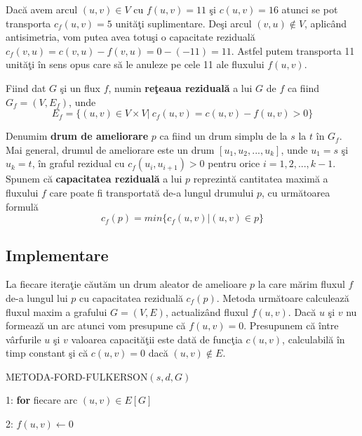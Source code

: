 \documentclass[11pt,a4paper]{report}
\begin{document}
   	  
   	  Dac\u a avem  arcul $(u,v)\in V$ cu $f(u,v)=11$ \c si $c(u,v)=16$ atunci se pot transporta $c_f(u,v)=5$ unit\u a\c ti suplimentare. De\c si arcul $(v,u)\notin V$, aplic\^ and antisimetria, vom putea avea totu\c si o capacitate rezidual\u a $c_f(v,u)=c(v,u)-f(v,u)=0-(-11)=11$. Astfel putem transporta 11 unit\u a\c ti \^ in sens opus care s\u a le anuleze pe cele 11 ale fluxului $f(u,v)$.
   	  
   	  
   	  Fiind dat $G$ \c si un flux $f$, numin \textbf{re\c teaua rezidual\u a} a lui $G$ de $f$ ca fiind $G_f=(V,E_f)$, unde 
     \begin{equation*}
	  E_f=\{(u,v)\in V\times V|\ c_f(u,v)=c(u,v)-f(u,v) >0 \}
	  \end{equation*} 	
   	


   	
  Denumim \textbf{drum de ameliorare} $p$ ca fiind un drum simplu de la $s$ la $t$ \^ in $G_f$. Mai general, drumul de ameliorare este un drum $[u_1,u_2,...,u_k]$, unde $u_1=s$ \c si $u_k=t$, \^ in graful rezidual cu $c_f(u_i,u_{i+1})>0$ pentru orice $i=1,2,...,k-1$. Spunem c\u a \textbf{capacitatea rezidual\u a} a lui $p$ reprezint\u a cantitatea maxim\u a a fluxului $f$ care poate fi transportat\u a de-a lungul drumului $p$, cu urm\u atoarea formul\u a
       \begin{equation*}
 c_f(p)=min\{c_f(u,v)|(u,v)\in p\}
  \end{equation*}
  \subsection{Implementare}
   La fiecare itera\c tie c\u aut\u am un drum aleator de amelioare $p$ la care m\u arim fluxul $f$ de-a lungul lui $p$ cu capacitatea rezidual\u a $c_f(p)$. Metoda urm\u atoare calculeaz\u a fluxul maxim a grafului $G=(V,E)$, actualiz\^ and fluxul $f(u,v)$. Dac\u a $u$ \c si $v$ nu formeaz\u a un arc atunci vom presupune c\u a $f(u,v)=0$. Presupunem c\u a \^ intre v\^ arfurile $u$ \c si $v$ valoarea capacit\u a\c tii este dat\u a de func\c tia $c(u,v)$, calculabil\u a \^ in timp constant \c si c\u a $c(u,v)=0$ dac\u a $(u,v)\notin E$.
   	
   	\vspace{0.3cm}
   	METODA-FORD-FULKERSON$(s,d,G)$  	
   	\vspace{0.1cm}
   	
   	1: \textbf{for} fiecare arc $(u,v)\in E[G]$ 
   	
   	2: \hspace{0.6cm} $f(u,v)\leftarrow 0$
   	
\end{document}
